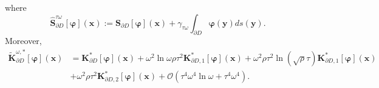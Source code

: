 \documentclass[10pt,reqno,oneside]{amsart}%
\theoremstyle{definition}
\theoremstyle{remark}
\numberwithin{equation}{section}
\numberwithin{equation}{section}
\begin{document}
where
\begin{equation}\label{hats2}
\hat{\mathbf{S}}_{\partial D}^{\tau\omega}[\boldsymbol{\varphi}](\mathbf{x}):=\mathbf{S}_{\partial D}[\boldsymbol{\varphi}](\mathbf{x})+\gamma_{\tau\omega}\int_{\partial D}\boldsymbol{\varphi}(\mathbf{y})d s(\mathbf{y}).
\end{equation}
Moreover,
\begin{align}\label{tildenplayer}
\tilde{\mathbf{K}}_{\partial D}^{\omega,*}[\boldsymbol{\varphi}](\mathbf{x})&=\mathbf{K}_{\partial D}^{*}[\boldsymbol{\varphi}](\mathbf{x})
+\omega^2\ln\omega\rho\tau^2\mathbf{K}_{\partial D,1}^{*}[\boldsymbol{\varphi}](\mathbf{x})+\omega^2\rho\tau^2 \ln(\sqrt{\rho}\tau)\mathbf{K}_{\partial D,1}^{*}[\boldsymbol{\varphi}](\mathbf{x})\nonumber\\
&+\omega^2\rho\tau^2\mathbf{K}_{\partial D,2}^{*}[\boldsymbol{\varphi}](\mathbf{x})+\mathcal{O}(\tau^4\omega^4\ln{\omega}+\tau^4\omega^4).
\end{align}
\end{document}
